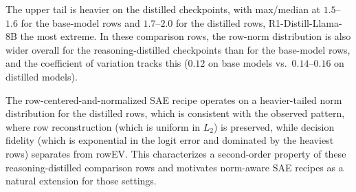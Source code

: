 The upper tail is heavier on the distilled
checkpoints, with max/median at $1.5$--$1.6$ for the base-model rows and
$1.7$--$2.0$ for the distilled rows, R1-Distill-Llama-8B the most
extreme. In these comparison rows, the row-norm distribution is also wider
overall for the reasoning-distilled checkpoints than for the base-model
rows, and the coefficient of
variation tracks this ($0.12$ on base models vs.\ $0.14$--$0.16$ on distilled
models).

The row-centered-and-normalized SAE recipe operates on a heavier-tailed
norm distribution for the distilled rows, which is consistent with the
observed pattern, where row reconstruction (which is uniform in $L_2$) is preserved,
while decision fidelity (which is exponential in the logit error and dominated
by the heaviest rows) separates from rowEV. This characterizes a second-order
property of these reasoning-distilled comparison rows and motivates norm-aware
SAE recipes as a natural extension for those settings.

\ReadoutSAEFloatBarrier
